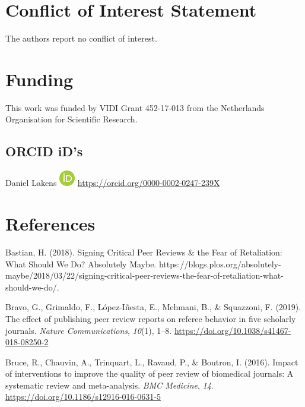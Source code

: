 \documentclass[
  english,
  ,jou, a4paper,floatsintext]{apa6}
\begin{document}
\hypertarget{conflict-of-interest-statement}{%
\section{Conflict of Interest Statement}\label{conflict-of-interest-statement}}

The authors report no conflict of interest.

\hypertarget{funding}{%
\section{Funding}\label{funding}}

This work was funded by VIDI Grant 452-17-013 from the Netherlands Organisation for Scientific Research.

\hypertarget{orcid-ids}{%
\subsection{ORCID iD's}\label{orcid-ids}}

Daniel Lakens \includegraphics{orcid.png} \url{https://orcid.org/0000-0002-0247-239X}

\hypertarget{references}{%
\section{References}\label{references}}

\setlength{\parindent}{-0.5in}
\setlength{\leftskip}{0.5in}

\hypertarget{refs}{}
\leavevmode\hypertarget{ref-bastian_signing_2018}{}%
Bastian, H. (2018). Signing Critical Peer Reviews \& the Fear of Retaliation: What Should We Do? \textbar{} Absolutely Maybe. https://blogs.plos.org/absolutely-maybe/2018/03/22/signing-critical-peer-reviews-the-fear-of-retaliation-what-should-we-do/.

\leavevmode\hypertarget{ref-bravo_effect_2019}{}%
Bravo, G., Grimaldo, F., López-Iñesta, E., Mehmani, B., \& Squazzoni, F. (2019). The effect of publishing peer review reports on referee behavior in five scholarly journals. \emph{Nature Communications}, \emph{10}(1), 1--8. \url{https://doi.org/10.1038/s41467-018-08250-2}

\leavevmode\hypertarget{ref-bruce_impact_2016}{}%
Bruce, R., Chauvin, A., Trinquart, L., Ravaud, P., \& Boutron, I. (2016). Impact of interventions to improve the quality of peer review of biomedical journals: A systematic review and meta-analysis. \emph{BMC Medicine}, \emph{14}. \url{https://doi.org/10.1186/s12916-016-0631-5}
\end{document}
